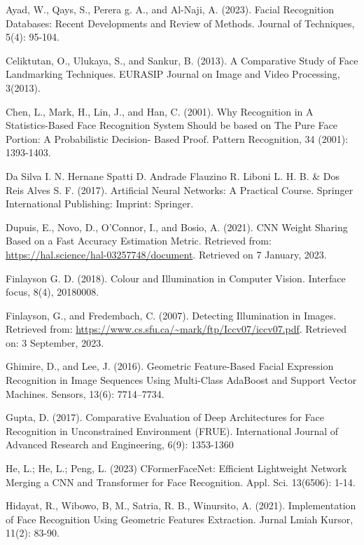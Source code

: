 \documentclass[
  12pt,
]{report}
\begin{document}
Ayad, W., Qays, S., Perera g. A., and Al-Naji, A. (2023). Facial
Recognition Databases: \hangindent=40pt Recent Developments and Review
of Methods. Journal of Techniques, 5(4): 95-104.

Celiktutan, O., Ulukaya, S., and Sankur, B. (2013). A Comparative Study
of Face \hangindent=40pt Landmarking Techniques. EURASIP Journal on
Image and Video Processing, 3(2013).

Chen, L., Mark, H., Lin, J., and Han, C. (2001). Why Recognition in A
Statistics-Based \hangindent=40pt Face Recognition System Should be
based on The Pure Face Portion: A Probabilistic Decision- Based Proof.
Pattern Recognition, 34 (2001): 1393-1403.

Da Silva I. N. Hernane Spatti D. Andrade Flauzino R. Liboni L. H. B. \&
Dos Reis \hangindent=40pt Alves S. F. (2017). Artificial Neural
Networks: A Practical Course. Springer International Publishing:
Imprint: Springer.

Dupuis, E., Novo, D., O'Connor, I., and Bosio, A. (2021). CNN Weight
Sharing Based on a \hangindent=40pt Fast Accuracy Estimation Metric.
Retrieved from: \url{https://hal.science/hal-03257748/document}.
Retrieved on 7 January, 2023.

Finlayson G. D. (2018). Colour and Illumination in Computer Vision.
Interface \hangindent=40pt focus, 8(4), 20180008.

Finlayson, G., and Fredembach, C. (2007). Detecting Illumination in
Images. \hangindent=40pt Retrieved from:
\url{https://www.cs.sfu.ca/~mark/ftp/Iccv07/iccv07.pdf}. Retrieved on: 3
September, 2023.

Ghimire, D., and Lee, J. (2016). Geometric Feature-Based Facial
Expression Recognition \hangindent=40pt in Image Sequences Using
Multi-Class AdaBoost and Support Vector Machines. Sensors, 13(6):
7714--7734.

Gupta, D. (2017). Comparative Evaluation of Deep Architectures for Face
\hangindent=40pt Recognition in Unconstrained Environment (FRUE).
International Journal of Advanced Research and Engineering, 6(9):
1353-1360

He, L.; He, L.; Peng, L. (2023) CFormerFaceNet: Efficient Lightweight
Network \hangindent=40pt Merging a CNN and Transformer for Face
Recognition. Appl. Sci. 13(6506): 1-14.

Hidayat, R., Wibowo, B, M., Satria, R. B., Winursito, A. (2021).
Implementation \hangindent=40pt of Face Recognition Using Geometric
Features Extraction. Jurnal Lmiah Kursor, 11(2): 83-90.
\end{document}
